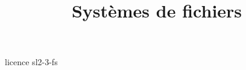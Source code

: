 \documentclass [xcolor=table] {beamer}
\title {Systèmes de fichiers}
\begin{document}
 {licence}
 {sl2-3-fs}
\end{document}
